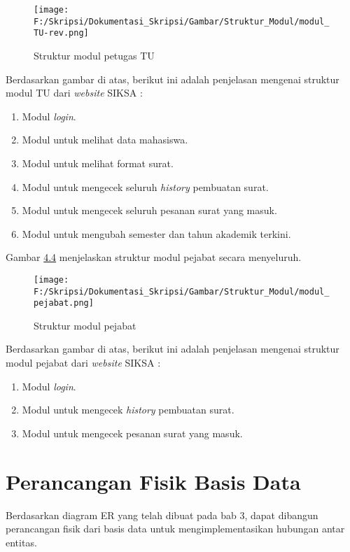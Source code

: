 \begin{figure}[H]
	\centering
		\texttt{[image: F:/Skripsi/Dokumentasi\_Skripsi/Gambar/Struktur\_Modul/modul\_TU-rev.png]}
	\caption{Struktur modul petugas TU}
	\label{fig:struktur_modul_TU}
\end{figure}

Berdasarkan gambar di atas, berikut ini adalah penjelasan mengenai struktur modul TU dari \textit{website} SIKSA :
\begin{enumerate}
	\item Modul \textit{login}.
	\item Modul untuk melihat data mahasiswa.
	\item Modul untuk melihat format surat.
	\item Modul untuk mengecek seluruh \textit{history} pembuatan surat.
	\item Modul untuk mengecek seluruh pesanan surat yang masuk.
	\item Modul untuk mengubah semester dan tahun akademik terkini.
\end{enumerate}

Gambar \hyperlink{struktur_modul_pejabat}{4.4} menjelaskan struktur modul pejabat secara menyeluruh.

\begin{figure}[H]
	\centering
		\texttt{[image: F:/Skripsi/Dokumentasi\_Skripsi/Gambar/Struktur\_Modul/modul\_pejabat.png]}
	\caption{Struktur modul pejabat}
	\label{fig:struktur_modul_pejabat}
\end{figure}

Berdasarkan gambar di atas, berikut ini adalah penjelasan mengenai struktur modul pejabat dari \textit{website} SIKSA :
\begin{enumerate}
	\item Modul \textit{login}.
	\item Modul untuk mengecek \textit{history} pembuatan surat.
	\item Modul untuk mengecek pesanan surat yang masuk.
\end{enumerate}

\section{Perancangan Fisik Basis Data}
\label{sec:perancangan_fisik_basis_data}
Berdasarkan diagram ER yang telah dibuat pada bab 3, dapat dibangun perancangan fisik dari basis data untuk mengimplementasikan hubungan antar entitas.\

